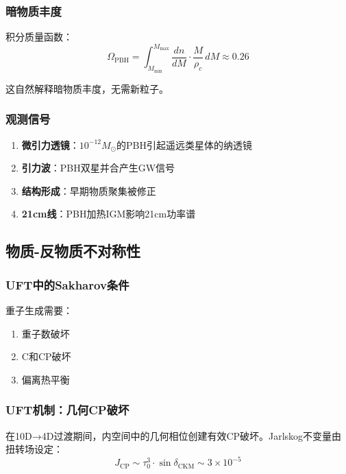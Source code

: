\subsubsection{暗物质丰度}

积分质量函数：
\begin{equation}
    \Omega_{\text{PBH}} = \int_{M_{\text{min}}}^{M_{\text{max}}} \frac{dn}{dM} \cdot \frac{M}{\rho_c} \, dM \approx 0.26
\end{equation}

这自然解释暗物质丰度，无需新粒子。

\subsubsection{观测信号}

\begin{enumerate}
    \item \textbf{微引力透镜}：$10^{-12} M_\odot$的PBH引起遥远类星体的纳透镜
    \item \textbf{引力波}：PBH双星并合产生GW信号
    \item \textbf{结构形成}：早期物质聚集被修正
    \item \textbf{21cm线}：PBH加热IGM影响21cm功率谱
\end{enumerate}

\subsection{物质-反物质不对称性}

\subsubsection{UFT中的Sakharov条件}

重子生成需要：
\begin{enumerate}
    \item 重子数破坏
    \item C和CP破坏
    \item 偏离热平衡
\end{enumerate}

\subsubsection{UFT机制：几何CP破坏}

\begin{insight}[来自维数流的CP破坏]
在10D→4D过渡期间，内空间中的几何相位创建有效CP破坏。Jarlskog不变量由扭转场设定：
\begin{equation}
    J_{\text{CP}} \sim \tau_0^3 \cdot \sin\delta_{\text{CKM}} \sim 3 \times 10^{-5}
\end{equation}
\end{insight}

